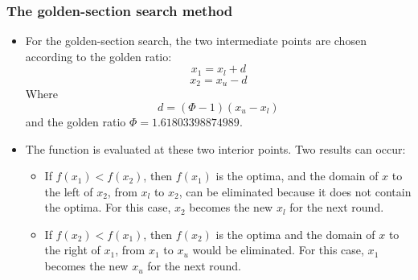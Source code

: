 \documentclass{if-beamer}
\begin{document}
\begin{frame}[t]
	\frametitle{The golden-section search method}
		\begin{minipage}{0.6\textwidth}
			\begin{itemize}
				\item For the golden-section search, the two intermediate points are chosen according to the golden ratio:
				$$x_1 = x_l + d $$
				$$x_2 = x_u - d $$
				Where $$d = (\Phi-1)(x_u-x_l)$$ and the golden ratio $\Phi = 1.61803398874989 $. \\\vspace{3pt}
				\item The function is evaluated at these two interior points. Two results can occur:
				\begin{itemize}
					\item If $f(x_1) < f (x_2)$, then $f (x_1)$ is the optima, and the domain of $x$ to the left of $x_2$, from $x_l$ to $x_2$, can be eliminated because it does not contain the optima. For this case, $x_2$ becomes the new $x_l$ for the next round.
					\item  If $f (x_2) < f (x_1)$, then $f (x_2)$ is the optima and the domain of $x$ to the right of $x_1$, from
					$x_1$ to $x_u$ would be eliminated. For this case, $x_1$ becomes the new $x_u$ for the next round.
				\end{itemize}
			\end{itemize}
		\end{minipage}
		\begin{minipage}{0.4\textwidth}
			\begin{figure}
				\centering

\end{figure}
\end{minipage}
\end{frame}
\end{document}
